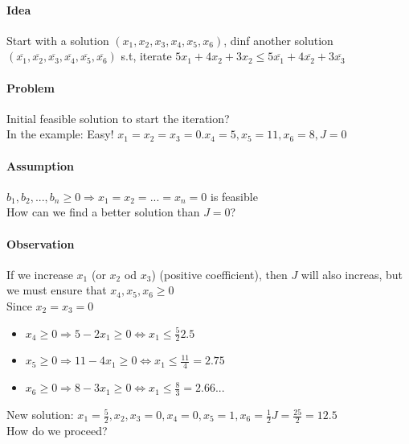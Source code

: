 \paragraph{Idea} Start with a solution $(x_1,x_2,x_3,x_4,x_5,x_6)$, dinf another solution $(\overline{x_1},\overline{x_2},\overline{x_3},\overline{x_4},\overline{x_5},\overline{x_6})$ s.t, iterate $5x_1+4x_2+3x_2 \leq 5\overline{x_1} + 4\overline{x_2} + 3\overline{x_3}$
\paragraph{Problem} Initial feasible solution to start the iteration? \\
In the example: Easy! $x_1=x_2=x_3=0.x_4=5,x_5=11,x_6=8,J=0$
\paragraph{Assumption} $b_1,b_2,...,b_n \geq 0 \Rightarrow x_1 = x_2 = ... = x_n = 0$ is feasible \\
How can we find a better solution than $J=0$?
\paragraph{Observation} If we increase $x_1$ (or $x_2$ od $x_3$) (positive coefficient), then $J$ will also increas, but we must ensure that $x_4,x_5,x_6 \geq 0$ \\
Since $x_2=x_3 = 0$
\begin{itemize}
	\item $x_4 \geq 0 \Rightarrow 5-2x_1 \geq 0 \Leftrightarrow x_1 \leq \frac{5}{2} 2.5$
	\item $x_5 \geq 0 \Rightarrow 11-4x_1 \geq 0 \Leftrightarrow x_1 \leq \frac{11}{4} = 2.75$ 
	\item $x_6 \geq 0 \Rightarrow 8 -3x_1 \geq 0 \Leftrightarrow x_1 \leq \frac{8}{3}= 2.66...$
\end{itemize}
New solution: $x_1 = \frac{5}{2}, x_2,x_3 = 0, x_4 = 0, x_5 = 1, x_6 = \frac{1}{2} J = \frac{25}{2} = 12.5$ \\
How do we proceed? 
